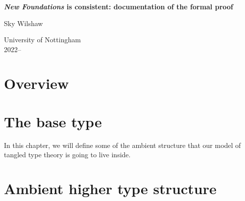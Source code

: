 \documentclass{book}
\begin{document}

\begin{titlepage}
	\begin{center}
		\vspace*{1cm}

		\Huge
		\textbf{\emph{New Foundations} is consistent: documentation of the formal proof}

		\vspace{0.5cm}
		\LARGE
		Sky Wilshaw

		\vfill

		\Large
		University of Nottingham\\
		2022--\the\year{}

	\end{center}
\end{titlepage}

\dominitoc{}

\setcounter{tocdepth}{1}
\tableofcontents
\newpage
\setcounter{tocdepth}{3}

\chapter{Overview}



\chapter{The base type}

In this chapter, we will define some of the ambient structure that our model of tangled type theory is going to live inside.

\medskip
\minitoc
\newpage









\chapter{Ambient higher type structure}

\minitoc
\newpage





\end{document}
